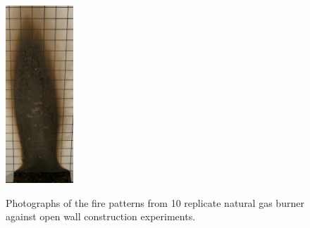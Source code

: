 \documentclass[twoside]{uocthesis}
\begin{document}
{\begin{figure}[p]
	\includegraphics[width=1.0in]{../Figures/GBNG13_P5120356} \\

	\caption[Photographs of the fire patterns from 10 replicate natural gas burner against open wall construction experiments.]{Photographs of the fire patterns from 10 replicate natural gas burner against open wall construction experiments.}
	\label{NG_Open_Wall}
\end{figure}


}
\end{document}
